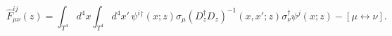 \begin{equation}\label{associateF}
\hat F^{ij}_{\mu\nu}(z)
=\int_{T^4}d^4x\int_{T^4}d^4x'\,
\psi^i{}^\dagger(x;z)\sigma_\mu (D_z^\dagger D_z)^{-1}
(x,x';z)\sigma_\nu^\dagger
\psi^j(x;z)-[\mu\leftrightarrow\nu].
\end{equation}

